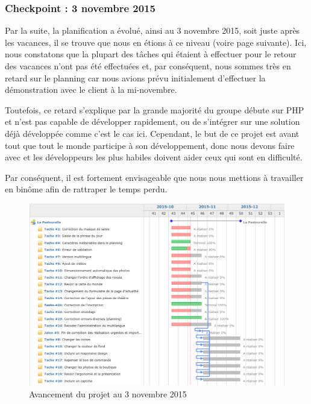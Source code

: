 \documentclass[11pt]{report}
\begin{document}
\subsubsection*{Checkpoint : 3 novembre 2015}
Par la suite, la planification a évolué, ainsi au 3 novembre 2015, soit juste
après les vacances, il se trouve que nous en étions à ce niveau (voire page
suivante). Ici, nous constatons que la plupart des tâches qui étaient à
effectuer pour le retour des vacances n'ont pas été effectuées et, par
conséquent, nous sommes très en retard sur le planning car nous avions prévu
initialement d'effectuer la démonstration avec le client à la mi-novembre.
\par Toutefois, ce retard s'explique par la grande majorité du groupe débute sur
PHP et n'est pas capable de développer rapidement, ou de s'intégrer sur une
solution déjà développée comme c'est le cas ici. Cependant, le but de ce projet
est avant tout que tout le monde participe à son développement, donc nous devons
faire avec et les développeurs les plus habiles doivent aider ceux qui sont en
difficulté. 
\par Par conséquent, il est fortement envisageable que nous nous mettions à
travailler en binôme afin de rattraper le temps perdu.

\begin{landscape}
\begin{figure}[t]
    \caption{Avancement du projet au 3 novembre 2015}
   \includegraphics[scale=0.5]{include/gantt3-11.png}
\end{figure}
\end{landscape}
\end{document}
